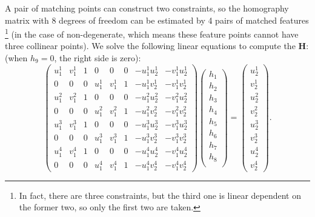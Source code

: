 A pair of matching points can construct two constraints, so the homography matrix with 8 degrees of freedom can be estimated by 4 pairs of matched features \footnote{In fact, there are three constraints, but the third one is linear dependent on the former two, so only the first two are taken.} (in the case of non-degenerate, which means these feature points cannot have three collinear points).  We solve the following linear equations to compute the $\mathbf{H}$: (when $h_9 = 0$, the right side is zero):
\begin{equation}
\begin{pmatrix}
u_{1}^{1}& v_{1}^{1}& 1 & 0 & 0 & 0 & -u_{1}^{1}u_{2}^{1} & -v_{1}^{1}u_{2}^{1}\\
0 & 0 & 0& u_{1}^{1}& v_{1}^{1}& 1 &  -u_{1}^{1}v_{2}^{1} & -v_{1}^{1}v_{2}^{1}\\
u_{1}^{2}& v_{1}^{2}& 1 & 0 & 0 & 0 & -u_{1}^{2}u_{2}^{2} & -v_{1}^{2}u_{2}^{2}\\
0 & 0 & 0& u_{1}^{2}& v_{1}^{2}& 1 &  -u_{1}^{2}v_{2}^{2} & -v_{1}^{2}v_{2}^{2}\\
u_{1}^{3}& v_{1}^{3}& 1 & 0 & 0 & 0 & -u_{1}^{3}u_{2}^{3} & -v_{1}^{3}u_{2}^{3}\\
0 & 0 & 0& u_{1}^{3}& v_{1}^{3}& 1 &  -u_{1}^{3}v_{2}^{3} & -v_{1}^{3}v_{2}^{3}\\
u_{1}^{4}& v_{1}^{4}& 1 & 0 & 0 & 0 & -u_{1}^{4}u_{2}^{4} & -v_{1}^{4}u_{2}^{4}\\
0 & 0 & 0& u_{1}^{4}& v_{1}^{4}& 1 &  -u_{1}^{4}v_{2}^{4} & -v_{1}^{4}v_{2}^{4}
\end{pmatrix}
\begin{pmatrix}
 h_{1}\\h_{2}\\h_{3}\\ h_{4}\\h_{5}\\h_{6}\\ h_{7}\\h_{8}\\  
\end{pmatrix}
=
\begin{pmatrix}
u_{2}^{1}\\ v_{2}^{1}\\ u_{2}^{2}\\ v_{2}^{2}\\u_{2}^{3}\\ v_{2}^{3}\\u_{2}^{4}\\ v_{2}^{4}
\end{pmatrix}.
\end{equation}

